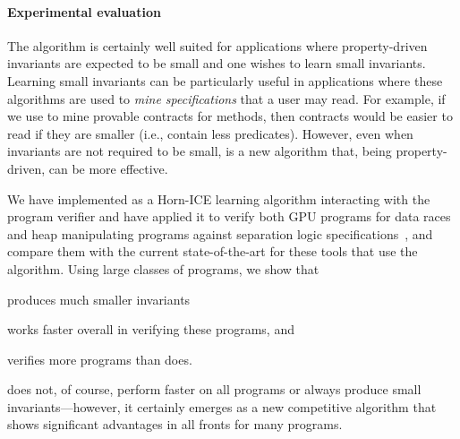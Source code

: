 \paragraph{\bfseries Experimental evaluation}
The \sorcar algorithm is certainly well suited for applications where property-driven invariants are expected to be small and one wishes to learn small invariants.
Learning small invariants can be particularly useful in applications where these algorithms are used to \emph{mine specifications} that a user may read.
For example, if we use \sorcar to mine provable contracts for methods, then contracts would be easier to read if they are smaller (i.e., contain less predicates).
However, even when invariants are not required to be small, \sorcar is a new algorithm that, being property-driven, can be more effective. 

We have implemented \sorcar as a Horn-ICE learning algorithm interacting with the \boogie program verifier and have applied it to verify both GPU programs for data races~\cite{DBLP:conf/oopsla/BettsCDQT12,DBLP:conf/oopsla/ChongDKKQ13} and heap manipulating programs against separation logic specifications~\cite{DBLP:conf/tacas/Neider0MS018}, and compare them with the current state-of-the-art for these tools that use the \houdini algorithm.
Using large classes of programs, we show that
\begin{enumerate*}[label={(\alph*)}]
    \item \sorcar produces much smaller invariants %
    \item works faster overall in verifying these programs, and
    \item verifies more programs than \houdini does.
\end{enumerate*}
\sorcar does not, of course, perform faster on all programs or always produce small invariants---however, it certainly emerges as a new competitive algorithm that shows significant advantages in all fronts for many programs.
